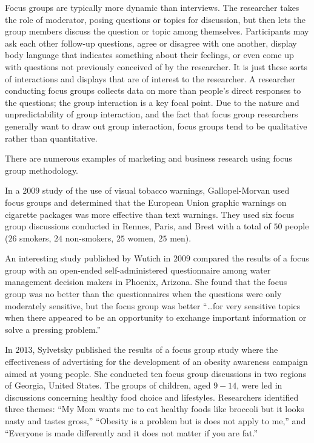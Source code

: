 Focus groups are typically more dynamic than interviews. The researcher takes the role of moderator, posing questions or topics for discussion, but then lets the group members discuss the question or topic among themselves. Participants may ask each other follow-up questions, agree or disagree with one another, display body language that indicates something about their feelings, or even come up with questions not previously conceived of by the researcher. It is just these sorts of interactions and displays that are of interest to the researcher. A researcher conducting focus groups collects data on more than people's direct responses to the questions; the group interaction is a key focal point. Due to the nature and unpredictability of group interaction, and the fact that focus group researchers generally want to draw out group interaction, focus groups tend to be qualitative rather than quantitative.

There are numerous examples of marketing and business research using focus group methodology. 

In a $ 2009 $ study of the use of visual tobacco warnings, Gallopel-Morvan \etal used focus groups and determined that the European Union graphic warnings on cigarette packages was more effective than text warnings. \cite{gallopel2011use} They used six focus group discussions conducted in Rennes, Paris, and Brest with a total of $ 50 $ people ($ 26 $ smokers, $ 24 $ non-smokers, $ 25 $ women, $ 25 $ men). 

An interesting study published by Wutich \etal in $ 2009 $ compared the results of a focus group with an open-ended self-administered questionnaire among water management decision makers in Phoenix, Arizona\cite{wutich2010comparing}. She found that the focus group was no better than the questionnaires when the questions were only moderately sensitive, but the focus group was better ``\ldots for very sensitive topics when there appeared to be an opportunity to exchange important information or solve a pressing problem.''

In $ 2013 $, Sylvetsky \etal published the results of a focus group study where the effectiveness of advertising for the development of an obesity awareness campaign aimed at young people. She conducted ten focus group discussions in two regions of Georgia, United States. The groups of children, aged $ 9 - 14 $, were led in discussions concerning healthy food choice and lifestyles. Researchers identified three themes: ``My Mom wants me to eat healthy foods like broccoli but it looks nasty and tastes gross,'' ``Obesity is a problem but is does not apply to me,'' and ``Everyone is made differently and it does not matter if you are fat.''

